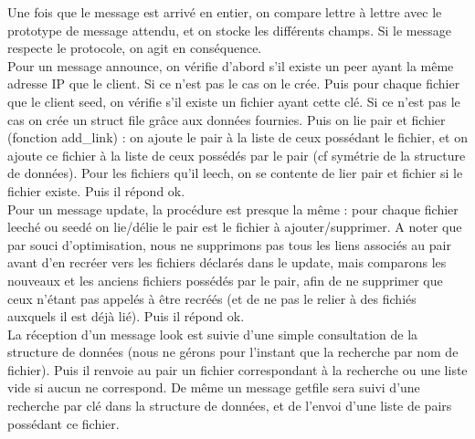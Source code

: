 Une fois que le message est arrivé en entier, on compare lettre à lettre avec le prototype de message attendu, et on stocke les différents champs. Si le message respecte le protocole, on agit en conséquence.\\

Pour un message announce, on vérifie d'abord s'il existe un peer ayant la même adresse IP que le client. Si ce n'est pas le cas on le crée. Puis pour chaque fichier que le client seed, on vérifie s'il existe un fichier ayant cette clé. Si ce n'est pas le cas on crée un struct file grâce aux données fournies. Puis on lie pair et fichier (fonction add\_link) : on ajoute le pair à la liste de ceux possédant le fichier, et on ajoute ce fichier à la liste de ceux possédés par le pair (cf symétrie de la structure de données). Pour les fichiers qu'il leech, on se contente de lier pair et fichier si le fichier existe. Puis il répond ok.\\

Pour un message update, la procédure est presque la même : pour chaque fichier leeché ou seedé on lie/délie le pair est le fichier à ajouter/supprimer. A noter que par souci d'optimisation, nous ne supprimons pas tous les liens associés au pair avant d'en recréer vers les fichiers déclarés dans le update, mais comparons les nouveaux et les anciens fichiers possédés par le pair, afin de ne supprimer que ceux n'étant pas appelés à être recréés (et de ne pas le relier à des fichiés auxquels il est déjà lié). Puis il répond ok.\\

La réception d'un message look est suivie d'une simple consultation de la structure de données (nous ne gérons pour l'instant que la recherche par nom de fichier).
Puis il renvoie au pair un fichier correspondant à la recherche ou une liste vide si aucun ne correspond. De même un message getfile sera suivi d'une recherche par clé dans la structure de données, et de l'envoi d'une liste de pairs possédant ce fichier.



